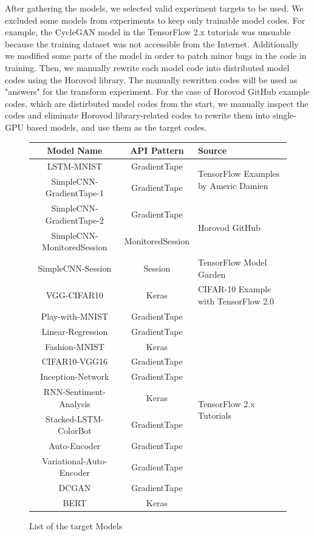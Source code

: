 After gathering the models, we selected valid experiment targets to be used. 
We excluded some models from experiments to keep only trainable model codes. 
For example, the CycleGAN model in the TensorFlow 2.x tutorials
was unsuable because the training dataset was not accessible from the
Internet. Additionally we modified some parts of the model in order to patch
minor bugs in the code in training.
Then, we manually rewrite each model code into distributed model codes using
the Horovod library. The manually rewritten codes will be used as "answers" 
for the transform experiment.
For the case of Horovod GitHub example codes, which are distirbuted model
codes from the start, we manually inspect the codes and eliminate
Horovod library-related codes to rewrite them into single-GPU based
models, and use them as the target codes.

\begin{figure}[!ht]
  \begin{center}
  \begin{tabular}{c|c|l}
    \hline
    Model Name & API Pattern & Source \\
    \hline
    LSTM-MNIST & GradientTape & \multirow{2}{*}{TensorFlow Examples by Americ Damien\cite{tfexamplesdamien}} \\
    SimpleCNN-GradientTape-1 & GradientTape \\
    \hline
    SimpleCNN-GradientTape-2 & GradientTape & \multirow{2}{*}{Horovod GitHub\cite{horovodgithub}} \\
    SimpleCNN-MonitoredSession & MonitoredSession  \\
    \hline
    SimpleCNN-Session & Session & TensorFlow Model Garden\cite{tfmodelgarden} \\
    \hline
    VGG-CIFAR10 & Keras & CIFAR-10 Example with TensorFlow 2.0\cite{cifar10github} \\
    \hline
    Play-with-MNIST & GradientTape & \multirow{11}{*}{TensorFlow 2.x Tutorials\cite{tf2tutogithub}} \\
    Linear-Regression & GradientTape  \\
    Fashion-MNIST & Keras  \\
    CIFAR10-VGG16 & GradientTape \\
    Inception-Network & GradientTape  \\
    RNN-Sentiment-Analysis & Keras  \\
    Stacked-LSTM-ColorBot & GradientTape  \\
    Auto-Encoder & GradientTape  \\
    Variational-Auto-Encoder & GradientTape  \\
    DCGAN & GradientTape  \\
    BERT & Keras  \\
    \hline
  \end{tabular}
  \end{center}
  \caption{List of the target Models}
  \label{fig:eval:targets}
\end{figure}

